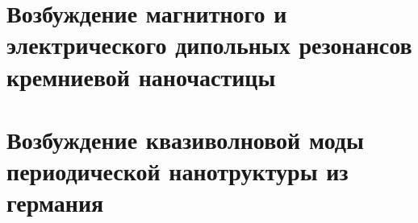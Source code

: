 \section{Возбуждение магнитного и электрического дипольных резонансов кремниевой наночастицы}

\section{Возбуждение квазиволновой моды периодической нанотруктуры из германия}

